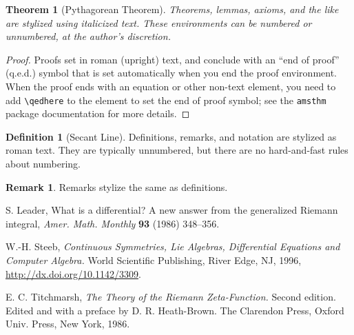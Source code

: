 \documentclass{article}
\newtheorem{theorem}{Theorem}
\theoremstyle{definition}
\newtheorem*{definition}{Definition}
\newtheorem*{remark}{Remark}
\begin{document}
\begin{theorem}[Pythagorean Theorem]
Theorems, lemmas, axioms, and the like are stylized using italicized text. These environments can be numbered or unnumbered, at the author's discretion.
\end{theorem}

\begin{proof}
Proofs set in roman (upright) text, and conclude with an ``end of proof'' (q.e.d.) symbol that is set automatically when you end the proof environment.  When the proof ends with an equation or other non-text element, you need to add \verb~\qedhere~ to the element to set the end of proof symbol; see the \texttt{amsthm} package documentation for more details.
\end{proof}

\begin{definition}[Secant Line]
Definitions, remarks, and notation are stylized as roman text.  They are typically unnumbered, but there are no hard-and-fast rules about numbering.
\end{definition}

\begin{remark}
Remarks stylize the same as definitions.
\end{remark}

\begin{thebibliography}{3}

 S. Leader, What is a differential? A new answer from the generalized Riemann integral, {\it Amer. Math. Monthly\/} {\bf 93} (1986) 348--356.

 W.-H. Steeb, \textit{Continuous Symmetries, Lie Algebras, Differential Equations and Computer Algebra.\/} World Scientific Publishing, River Edge, NJ, 1996, \href{http://dx.doi.org/10.1142/3309}{\url{http://dx.doi.org/10.1142/3309}}.

 E. C. Titchmarsh, {\it The Theory of the Riemann Zeta-Function.\/} Second edition. Edited and with a preface by D. R. Heath-Brown. The Clarendon Press, Oxford Univ. Press, New York, 1986.
\end{thebibliography}
\end{document}
